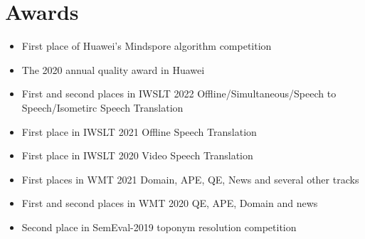 \documentclass{resume_en}
\begin{document}
\section{Awards}
\begin{itemize}[parsep=0.2ex]
  \item First place of Huawei's Mindspore algorithm competition
  \item The 2020 annual quality award in Huawei
  \item First and second places in IWSLT 2022 Offline/Simultaneous/Speech to Speech/Isometirc Speech Translation
  \item First place in IWSLT 2021 Offline Speech Translation
  \item First place in IWSLT 2020 Video Speech Translation
  \item First places in WMT 2021 Domain, APE, QE, News and several other tracks
  \item First and second places in WMT 2020 QE, APE, Domain and news
  \item Second place in SemEval-2019 toponym resolution competition
\end{itemize}
\end{document}

